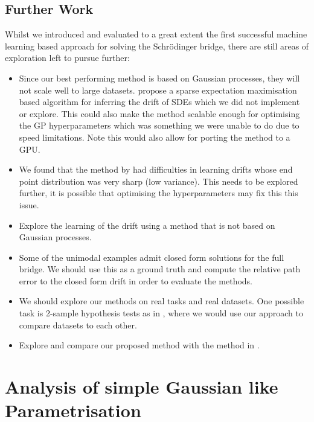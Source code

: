 \documentclass[a4paper,12pt,twoside,openright]{report}
\theoremstyle{definition}
\begin{document}
\section{Further Work}

Whilst we introduced and evaluated to a great extent the first successful machine learning based approach for solving the Schrödinger bridge, there are still areas of exploration left to pursue further:

\begin{itemize}
    \item Since our best performing method is based on Gaussian processes, they will not scale well to large datasets. \cite{ruttor2013approximate} propose a sparse expectation maximisation based algorithm for inferring the drift of SDEs which we did not implement or explore. This could also make the method scalable enough for optimising the GP hyperparameters which was something we were unable to do due to speed limitations. Note this would also allow for porting the method to a GPU.
    \item We found that the method by \cite{ruttor2013approximate} had difficulties in learning drifts whose end point distribution was very sharp (low variance). This needs to be explored further, it is possible that optimising the hyperparameters may fix this this issue.  
    \item Explore the learning of the drift using a method that is not based on Gaussian processes.
    \item Some of the unimodal examples admit closed form solutions for the full bridge. We should use this as a ground truth and compute the relative path error to the closed form drift in order to evaluate the methods.
    \item We should explore our methods on real tasks and real datasets. One possible task is 2-sample hypothesis tests as in \cite{gretton2012kernel}, where we would use our approach to compare datasets to each other. 
    \item Explore and compare our proposed method with the method in \cite{bernton2019schr}.
\end{itemize}

\appendix


\singlespacing

\chapter{Analysis of simple Gaussian like Parametrisation}\label{app:bad_gauss}
\end{document}
